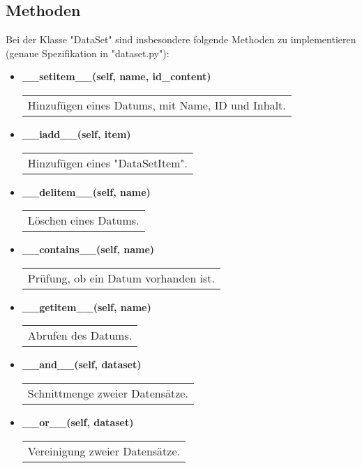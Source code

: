 \documentclass[a4paper,12pt]{article}
\begin{document}
\subsection{Methoden}
Bei der Klasse "DataSet" sind insbesondere folgende Methoden zu implementieren (genaue Spezifikation in "dataset.py"):
\begin{itemize}
    \item \textbf{\_\_setitem\_\_(self, name, id\_content)} \\
    \begin{tabular}{p{\linewidth}}
    Hinzufügen eines Datums, mit Name, ID und Inhalt.
    \end{tabular}

    \item \textbf{\_\_iadd\_\_(self, item)} \\
    \begin{tabular}{p{\linewidth}}
    Hinzufügen eines "DataSetItem".
    \end{tabular}

    \item \textbf{\_\_delitem\_\_(self, name)} \\
    \begin{tabular}{p{\linewidth}}
    Löschen eines Datums.
    \end{tabular}

    \item \textbf{\_\_contains\_\_(self, name)} \\
    \begin{tabular}{p{\linewidth}}
    Prüfung, ob ein Datum vorhanden ist.
    \end{tabular}

    \item \textbf{\_\_getitem\_\_(self, name)} \\
    \begin{tabular}{p{\linewidth}}
    Abrufen des Datums.
    \end{tabular}

    \item \textbf{\_\_and\_\_(self, dataset)} \\
    \begin{tabular}{p{\linewidth}}
    Schnittmenge zweier Datensätze.
    \end{tabular}

    \item \textbf{\_\_or\_\_(self, dataset)} \\
    \begin{tabular}{p{\linewidth}}
    Vereinigung zweier Datensätze.
    \end{tabular}


\end{itemize}
\end{document}
